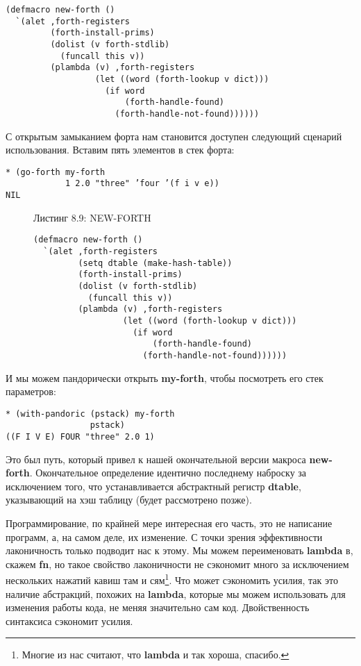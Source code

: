\begin{verbatim}
(defmacro new-forth ()
  `(alet ,forth-registers
         (forth-install-prims)
         (dolist (v forth-stdlib)
           (funcall this v))
         (plambda (v) ,forth-registers
                  (let ((word (forth-lookup v dict)))
                    (if word
                        (forth-handle-found)
                      (forth-handle-not-found))))))
\end{verbatim}

С открытым замыканием форта нам становится доступен следующий сценарий использования. Вставим пять элементов в стек форта:

\begin{verbatim}
* (go-forth my-forth
            1 2.0 "three" ’four ’(f i v e))
NIL
\end{verbatim}

\begin{figure}Листинг 8.9: NEW-FORTH\label{listing_8.9}
\listbegin
\begin{verbatim}
(defmacro new-forth ()
  `(alet ,forth-registers
         (setq dtable (make-hash-table))
         (forth-install-prims)
         (dolist (v forth-stdlib)
           (funcall this v))
         (plambda (v) ,forth-registers
                  (let ((word (forth-lookup v dict)))
                    (if word
                        (forth-handle-found)
                      (forth-handle-not-found))))))
\end{verbatim}
  \listend
\end{figure}

И мы можем пандорически открыть \textbf{my-forth}, чтобы посмотреть его стек параметров:

\begin{verbatim}
* (with-pandoric (pstack) my-forth
                 pstack)
((F I V E) FOUR "three" 2.0 1)
\end{verbatim}

Это был путь, который привел к нашей окончательной версии макроса \textbf{new-forth}. Окончательное определение идентично последнему наброску за исключением того, что устанавливается абстрактный регистр \textbf{dtable}, указывающий на хэш таблицу (будет рассмотрено позже).

Программирование, по крайней мере интересная его часть, это не написание программ, а, на самом деле, их изменение. С точки зрения эффективности лаконичность только подводит нас к этому. Мы можем переименовать \textbf{lambda} в, скажем \textbf{fn}, но такое свойство лаконичности не сэкономит много за исключением нескольких нажатий кавиш там и сям\footnote{Многие из нас считают, что \textbf{lambda} и так хороша, спасибо.}. Что может сэкономить усилия, так это наличие абстракций, похожих на \textbf{lambda}, которые мы можем использовать для изменения работы кода, не меняя значительно сам код. Двойственность синтаксиса сэкономит усилия. 

